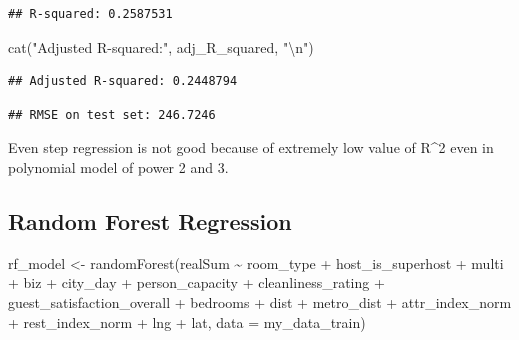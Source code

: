 \documentclass[
]{article}
\newenvironment{Shaded}{\begin{snugshade}}{\end{snugshade}}
\newcommand{\AttributeTok}[1]{\textcolor[rgb]{0.77,0.63,0.00}{#1}}
\newcommand{\CommentTok}[1]{\textcolor[rgb]{0.56,0.35,0.01}{\textit{#1}}}
\newcommand{\DecValTok}[1]{\textcolor[rgb]{0.00,0.00,0.81}{#1}}
\newcommand{\FunctionTok}[1]{\textcolor[rgb]{0.00,0.00,0.00}{#1}}
\newcommand{\NormalTok}[1]{#1}
\newcommand{\OtherTok}[1]{\textcolor[rgb]{0.56,0.35,0.01}{#1}}
\newcommand{\SpecialCharTok}[1]{\textcolor[rgb]{0.00,0.00,0.00}{#1}}
\newcommand{\StringTok}[1]{\textcolor[rgb]{0.31,0.60,0.02}{#1}}
\begin{document}
\begin{verbatim}
## R-squared: 0.2587531
\end{verbatim}

\begin{Shaded}
\begin{Highlighting}[]
\FunctionTok{cat}\NormalTok{(}\StringTok{"Adjusted R{-}squared:"}\NormalTok{, adj\_R\_squared, }\StringTok{"}\SpecialCharTok{\textbackslash{}n}\StringTok{"}\NormalTok{)}
\end{Highlighting}
\end{Shaded}

\begin{verbatim}
## Adjusted R-squared: 0.2448794
\end{verbatim}

\begin{Shaded}
\end{Shaded}

\begin{verbatim}
## RMSE on test set: 246.7246
\end{verbatim}

Even step regression is not good because of extremely low value of
R\^{}2 even in polynomial model of power 2 and 3.

\hypertarget{random-forest-regression-1}{%
\subsection{Random Forest Regression}\label{random-forest-regression-1}}

\begin{Shaded}
\begin{Highlighting}[]
\NormalTok{rf\_model }\OtherTok{\textless{}{-}} \FunctionTok{randomForest}\NormalTok{(realSum }\SpecialCharTok{\textasciitilde{}}\NormalTok{ room\_type }\SpecialCharTok{+}\NormalTok{ host\_is\_superhost }\SpecialCharTok{+}
\NormalTok{    multi }\SpecialCharTok{+}\NormalTok{ biz }\SpecialCharTok{+}\NormalTok{ city\_day }\SpecialCharTok{+}\NormalTok{ person\_capacity }\SpecialCharTok{+}\NormalTok{ cleanliness\_rating }\SpecialCharTok{+}
\NormalTok{    guest\_satisfaction\_overall }\SpecialCharTok{+}\NormalTok{ bedrooms }\SpecialCharTok{+}\NormalTok{ dist }\SpecialCharTok{+}\NormalTok{ metro\_dist }\SpecialCharTok{+}
\NormalTok{    attr\_index\_norm }\SpecialCharTok{+}\NormalTok{ rest\_index\_norm }\SpecialCharTok{+}\NormalTok{ lng }\SpecialCharTok{+}\NormalTok{ lat, }\AttributeTok{data =}\NormalTok{ my\_data\_train)}
\end{Highlighting}
\end{Shaded}
\end{document}
